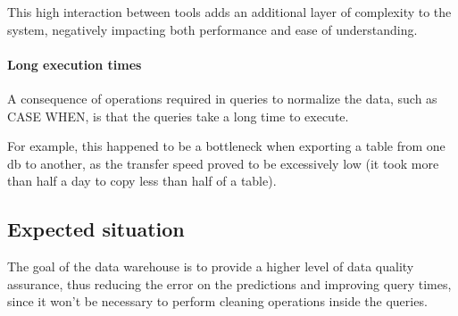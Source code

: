         This high interaction between tools adds an additional layer of complexity to the system, negatively impacting both performance and ease of understanding.\reword
        
    \paragraph{Long execution times}
        A consequence of operations required in queries to normalize the data, such as CASE WHEN, is that the queries take a long time to execute.
        
        For example, this happened to be a bottleneck when exporting a table from one db to another, as the transfer speed proved to be excessively low (it took more than half a day to copy less than half of a table).\reword

\subsection{Expected situation}
    \reword The goal of the data warehouse is to provide a higher level of data quality assurance, thus reducing the error on the predictions and improving query times, since it won't be necessary to perform cleaning operations inside the queries.
